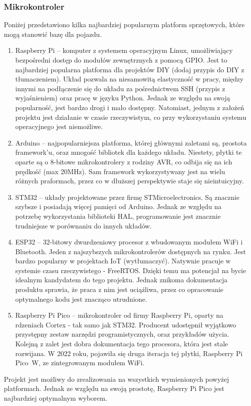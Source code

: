         \subsubsection{Mikrokontroler}
            Poniżej przedstawiono kilka najbardziej popularnym platform sprzętowych, które mogą stanowić bazę dla pojazdu.
            \begin{enumerate}
                \item Raspberry Pi -- komputer z systemem operacyjnym Linux, umożliwiający bezpośredni dostęp do modułów zewnętrznych z pomocą GPIO.
                Jest to najbardziej popularna platforma dla projektów DIY (dodaj przypis do DIY z tłumaczeniem). Układ pozwala na niesamowitą elastyczność w pracy, między innymi na podłączenie się do układu za pośrednictwem SSH (przypis z wyjaśnieniem) oraz pracę w języku Python.
                Jednak ze względu na swoją popularność, jest bardzo drogi i mało dostępny.
                Natomiast, jednym z założeń projektu jest działanie w czasie rzeczywistym, co przy wykorzystaniu systemu operacyjnego jest niemożliwe.
                \item Arduino -- najpopularniejsza platforma, której głównymi zaletami są, prostota framework'u, oraz mnogość bibliotek dla każdego układu.
                Niestety, płytki te oparte są o 8-bitowe mikrokontrolery z rodziny AVR, co odbija się na ich prędkość (max 20MHz).
                Sam framework wykorzystywany jest na wielu różnych praformach, przez co w dłuższej perspektywie staje się nieintuicyjny.
                \item STM32 -- układy projektowane przez firmę STMicroelectronics. Są znacznie szybsze i posiadają więcej pamięci od Arduino.
                Jednak ze względu na potrzebę wykorzystania biblioteki HAL, programowanie jest znacznie trudniejsze w porównaniu do innych układów.
                \item ESP32 -- 32-bitowy dwurdzeniowy procesor z wbudowanym modułem WiFi i Bluetooth.
                Jeden z najszybszych mikrokontrolerów dostępnych na rynku. Jest bardzo popularny w projektach IoT (wytłumaczyć).
                Natywnie pracuje w systemie czasu rzeczywistego - FreeRTOS. Dzięki temu ma potencjał na bycie idealnym kandydatem do tego projektu.
                Jednak znikoma dokumentacja produktu sprawia, że praca z nim jest uciążliwa, przez co opracowanie optymalnego kodu jest znacząco utrudnione.
                \item Raspberry Pi Pico -- mikrokontroler od firmy Raspberry Pi, oparty na rdzeniach Cortex - tak samo jak STM32.
                Producent udostępnił wyjątkowo przystępny zestaw narzędzi programistycznych, oraz przykładów użycia.
                Kolejną z zalet jest dobra dokumentacja tego procesora, która jest stale rozwijana.
                W 2022 roku, pojawiła się druga iteracja tej płytki, Raspberry Pi Pico~W, ze zintegrowanym modułem WiFi.
            \end{enumerate}
            Projekt jest możliwy do zrealizowania na wszystkich wymienionych powyżej platformach. Jednak ze względu na swoją prostotę, Raspberry Pi Pico jest najbardziej optymalnym wyborem.


